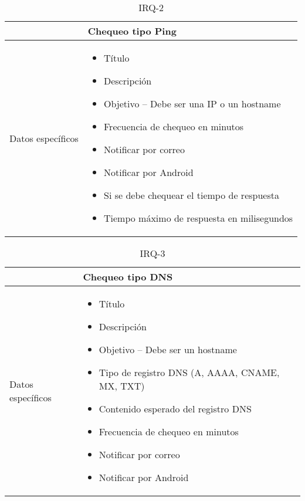\begin{table}[h!]
  \centering
  \begin{tabularx}{\textwidth}{|l|X|}
    \hline

    & Chequeo tipo Ping \\

    \hline
    Datos específicos &

    \begin{itemize}
      \item Título 
      \item Descripción
      \item Objetivo -- Debe ser una IP o un hostname
      \item Frecuencia de chequeo en minutos
      \item Notificar por correo
      \item Notificar por Android
      \item Si se debe chequear el tiempo de respuesta
      \item Tiempo máximo de respuesta en milisegundos
    \end{itemize}
    \\
    
    \hline
    
  \end{tabularx}
  \caption{IRQ-2}
\end{table}

\begin{table}[h!]
  \centering
  \begin{tabularx}{\textwidth}{|l|X|}
    \hline

    & Chequeo tipo DNS \\

    \hline
    Datos específicos &

    \begin{itemize}
      \item Título 
      \item Descripción
      \item Objetivo -- Debe ser un hostname
      \item Tipo de registro DNS (A, AAAA, CNAME, MX, TXT)
      \item Contenido esperado del registro DNS
      \item Frecuencia de chequeo en minutos
      \item Notificar por correo
      \item Notificar por Android
    \end{itemize}
    \\
    
    \hline
    
  \end{tabularx}
  \caption{IRQ-3}
\end{table}

